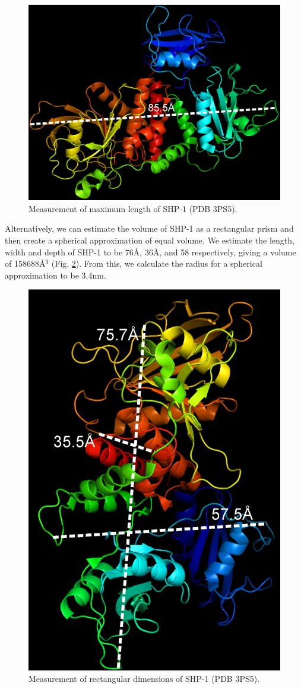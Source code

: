 \documentclass[../../AdvancementSummary.tex]{subfiles}
\begin{document}
\begin{figure}[H]
\begin{center}
\includegraphics[width=0.5\linewidth]{ResultsFigures/SHP1PyMol/Diagonal1.eps}
\end{center}
\caption{Measurement of maximum length of SHP-1 (PDB 3PS5). \label{fig: SHP1Diag}}
\end{figure}

Alternatively, we can estimate the volume of SHP-1 as a rectangular prism and then create a spherical approximation of equal volume. We estimate the length, width and depth of SHP-1 to be 76\AA, 36\AA, and 58\text{\AA} respectively, giving a volume of 158688\AA$^3$ (Fig. \ref{fig: SHP1Rectangle}). From this, we calculate the radius for a spherical approximation to be 3.4nm.

\begin{figure}[H]
\begin{center}
\includegraphics[width=0.4\linewidth]{ResultsFigures/SHP1PyMol/LengthWidthDepth.eps}
\end{center}
\caption{Measurement of rectangular dimensions of SHP-1 (PDB 3PS5). \label{fig: SHP1Rectangle} }
\end{figure}
\end{document}

